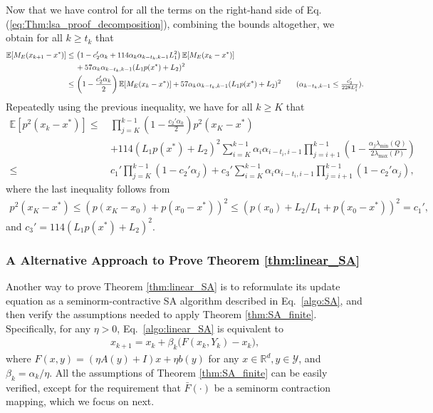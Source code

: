 \documentclass[11 pt]{article}
\begin{document}
	Now that we have control for all the terms on the right-hand side of Eq. (\ref{eq:Thm:lsa_proof_decomposition}), combining the bounds altogether, we obtain for all $k\geq t_k$ that
	\begin{align*}
		\mathbb{E}[M_E(x_{k+1}-x^*)]\leq \,&\left(1-c_2'\alpha_k+114\alpha_k\alpha_{k-t_k,k-1}L_1^2\right)\mathbb{E}[M_E(x_k-x^*)]\\
		&+57\alpha_k\alpha_{k-t_k,k-1}(L_1p(x^*)+L_2)^2\\
		\leq \,&\left(1-\frac{c_2'\alpha_k}{2}\right)\mathbb{E}[M_E(x_k-x^*)]+57\alpha_k\alpha_{k-t_k,k-1}(L_1p(x^*)+L_2)^2\tag{$\alpha_{k-t_k,k-1}\leq \frac{c_2'}{228L_1^2}$}.
	\end{align*}
	Repeatedly using the previous inequality, we have for all $k\geq K$ that
	\begin{align*}
		\mathbb{E}[p^2(x_k-x^*)]\leq\,& \prod_{j=K}^{k-1}\left(1-\frac{c_2'\alpha_k}{2}\right)p^2(x_K-x^*)\\
		&+114(L_1p(x^*)+L_2)^2\sum_{i=K}^{k-1}\alpha_i\alpha_{i-t_i,i-1}\prod_{j=i+1}^{k-1}\left(1-\frac{\alpha_j\lambda_{\min}(Q)}{2\lambda_{\max}(P)}\right)\\
		\leq \,&c_1'\prod_{j=K}^{k-1}\left(1-c_2'\alpha_j\right)+c_3'\sum_{i=K}^{k-1}\alpha_i\alpha_{i-t_i,i-1}\prod_{j=i+1}^{k-1}\left(1-c_2'\alpha_j\right),
	\end{align*}
	where the last inequality follows from 
	\begin{align*}
		p^2(x_K-x^*)\leq (p(x_K-x_0)+p(x_0-x^*))^2
		\leq(p(x_0)+L_2/L_1+p(x_0-x^*))^2
		=c_1',
	\end{align*}
	and $c_3'=114(L_1p(x^*)+L_2)^2$.
	
	
	
	\subsubsection{A Alternative Approach to Prove Theorem \ref{thm:linear_SA}}\label{ap:alternative}
	Another way to prove Theorem \ref{thm:linear_SA} is to reformulate its update equation as a seminorm-contractive SA algorithm described in Eq.~\eqref{algo:SA}, and then verify the assumptions needed to apply Theorem \ref{thm:SA_finite}. Specifically, for any $\eta > 0$, Eq.~\eqref{algo:linear_SA} is equivalent to  
	\begin{align}\label{eq:lsa_reform}  
		x_{k+1} = x_k + \beta_k \big(F(x_k, Y_k) - x_k\big),  
	\end{align}  
	where $F(x, y) = (\eta A(y) + I)x + \eta b(y)$ for any $x \in \mathbb{R}^d, y \in \mathcal{Y}$, and $\beta_k = \alpha_k / \eta$. All the assumptions of Theorem \ref{thm:SA_finite} can be easily verified, except for the requirement that $\bar{F}(\cdot)$ be a seminorm contraction mapping, which we focus on next.
	
\end{document}
